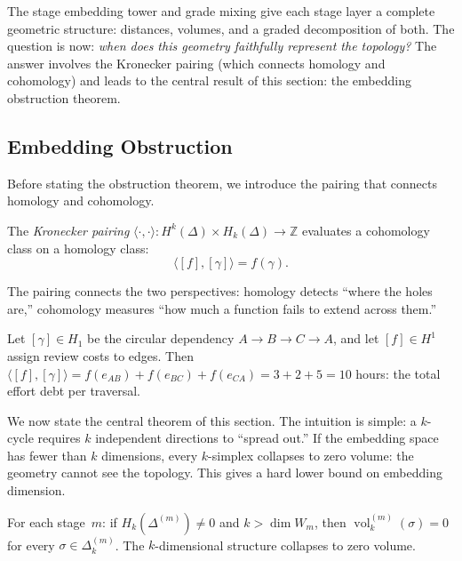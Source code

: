 \medskip

The stage embedding tower and grade mixing give each stage layer a complete geometric structure: distances, volumes, and a graded decomposition of both. The question is now: \emph{when does this geometry faithfully represent the topology?} The answer involves the Kronecker pairing (which connects homology and cohomology) and leads to the central result of this section: the embedding obstruction theorem.

\subsection{Embedding Obstruction}\label{sec:obstruction}

Before stating the obstruction theorem, we introduce the pairing that connects homology and cohomology.

\begin{definition}
\label{def:pairing}
The \emph{Kronecker pairing} $\langle \cdot, \cdot \rangle: H^k(\Delta) \times H_k(\Delta) \to \mathbb{Z}$ evaluates a cohomology class on a homology class:
\[
  \langle [f], [\gamma] \rangle = f(\gamma).
\]
\end{definition}

The pairing connects the two perspectives: homology detects ``where the holes are,'' cohomology measures ``how much a function fails to extend across them.''

\begin{example}
Let $[\gamma] \in H_1$ be the circular dependency $A \to B \to C \to A$, and let $[f] \in H^1$ assign review costs to edges. Then $\langle [f], [\gamma] \rangle = f(e_{AB}) + f(e_{BC}) + f(e_{CA}) = 3 + 2 + 5 = 10$ hours: the total effort debt per traversal.
\end{example}

We now state the central theorem of this section. The intuition is simple: a $k$-cycle requires $k$ independent directions to ``spread out.'' If the embedding space has fewer than $k$ dimensions, every $k$-simplex collapses to zero volume: the geometry cannot see the topology. This gives a hard lower bound on embedding dimension.

\begin{theorem}\label{thm:per-stage-obstruction}
For each stage~$m$: if $H_k(\Delta^{(m)}) \neq 0$ and $k > \dim W_m$, then $\operatorname{vol}_k^{(m)}(\sigma) = 0$ for every $\sigma \in \Delta_k^{(m)}$. The $k$-dimensional structure collapses to zero volume.
\end{theorem}

